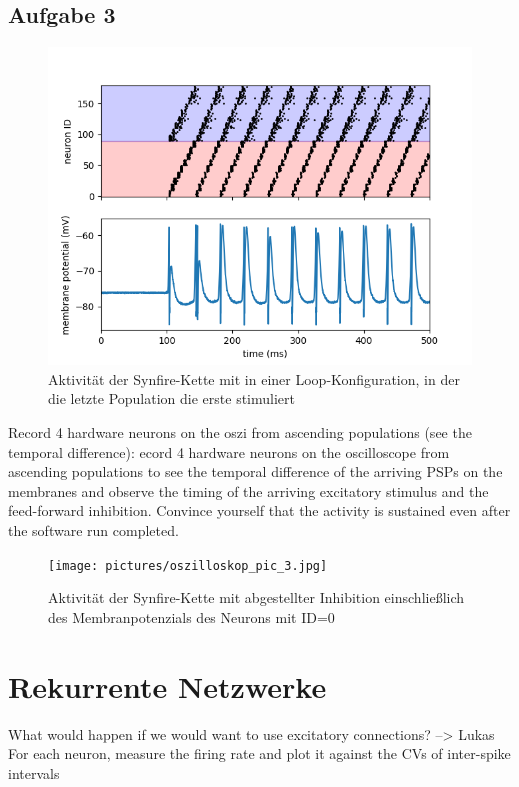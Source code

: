 \documentclass[10pt,a4paper]{scrartcl}
\begin{document}
\subsection{Aufgabe 3}

\begin{figure} [ht]
\begin{center}
\label{fig:abb4}
\caption{Aktivität der Synfire-Kette mit in einer Loop-Konfiguration, in der die letzte Population die erste stimuliert}
\includegraphics[scale=0.35]{pictures/synfire_chain_loop.png}
\end{center}
\end{figure}

Record 4 hardware neurons on the oszi from ascending populations (see the temporal difference):
ecord 4 hardware neurons on the oscilloscope from ascending populations to see the
temporal difference of the arriving PSPs on the membranes and observe the timing of
the arriving excitatory stimulus and the feed-forward inhibition. Convince yourself that
the activity is sustained even after the software run completed.


\begin{figure} [ht]
\begin{center}
\label{fig:abb4}
\caption{Aktivität der Synfire-Kette mit abgestellter Inhibition einschließlich des Membranpotenzials des Neurons mit ID=0}
\texttt{[image: pictures/oszilloskop\_pic\_3.jpg]}
\end{center}
\end{figure}

\newpage


\section{Rekurrente Netzwerke}
What would happen if we would want to use excitatory connections? --> Lukas
For each neuron, measure the firing rate and plot it against the
CVs of inter-spike intervals
\end{document}
